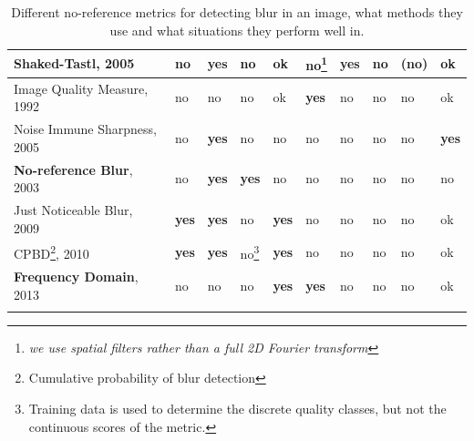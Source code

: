 \begin{longtable}{|| p{} || p{} | p{} | p{} | p{} | p{} | p{} | p{} | p{} | p{} ||}
    Shaked-Tastl\cite{jnbm13}, 2005 & %
        no & \textbf{yes} & no & ok & no\footnote{\textit{we use spatial filters rather than a full 2D Fourier transform}\cite{jnbm13}} & \textbf{yes} & no & (no) & ok \\\hline
    Image Quality Measure\cite{jnbm14}, 1992 & %
        no & no & no & ok & \textbf{yes} & no & no & no & ok \\\hline
    Noise Immune Sharpness\cite{jnbm03}\cite{jnbm07}, 2005 & %
        no & \textbf{yes} & no & no & no & no & no & no & \textbf{yes} \\\hline
    \textbf{No-reference Blur}\cite{jnbm17}, 2003 & %
        no & \textbf{yes} & \textbf{yes} & no & no & no & no & no & no \\\hline
    Just Noticeable Blur\cite{JNB}, 2009 & %
        \textbf{yes} & \textbf{yes} & no & \textbf{yes} & no & no & no & no & ok \\\hline
    CPBD\footnote{Cumulative probability of blur detection}\cite{CPBD}, 2010 & 
        \textbf{yes} & \textbf{yes} & no\footnote{Training data is used to determine the discrete quality classes, but not the continuous scores of the metric.} & \textbf{yes} & no & no & no & no & ok \\\hline
    \textbf{Frequency Domain}\cite{FM}, 2013 & %
        no & no & no & \textbf{yes} & \textbf{yes} & no & no & no & ok \\\hline %
    \caption{Different no-reference metrics for detecting blur in an image, what methods they use and what situations they perform well in.} \label{tab:blur_metrics}
\end{longtable}


